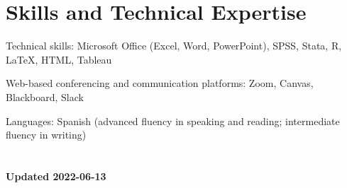 \documentclass[10pt,]{article}
\renewenvironment{itemize}{
  \begin{list}{}{
    \setlength{\leftmargin}{1.5em}
  }
}{
  \end{list}
}
\begin{document}
\hypertarget{skills-and-technical-expertise}{%
\section{Skills and Technical
Expertise}\label{skills-and-technical-expertise}}

\begin{itemize}
\item
  Technical skills: Microsoft Office (Excel, Word, PowerPoint), SPSS,
  Stata, R, \LaTeX, HTML, Tableau
\item
  Web-based conferencing and communication platforms: Zoom, Canvas,
  Blackboard, Slack
\item
  Languages: Spanish (advanced fluency in speaking and reading;
  intermediate fluency in writing)
\end{itemize}

\hypertarget{section}{%
\section{}\label{section}}

\textbf{Updated 2022-06-13}
\end{document}
